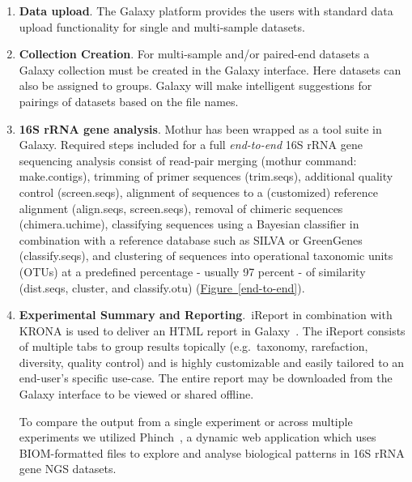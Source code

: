 \begin{enumerate}
\item \textbf{Data upload}.
The Galaxy platform provides the users with standard data upload functionality for single and multi-sample datasets.

\item \textbf{Collection Creation}.
For multi-sample and/or paired-end datasets a Galaxy collection must be created in the Galaxy interface. Here datasets can also be assigned to groups. Galaxy will make intelligent suggestions for pairings of datasets based on the file names.

\item \textbf{16S rRNA gene analysis}. Mothur has been wrapped as a tool suite in Galaxy. Required steps included for a full \textit{end-to-end} 16S rRNA gene sequencing analysis consist of read-pair merging (mothur command: make.contigs), trimming of primer sequences (trim.seqs), additional quality control (screen.seqs), alignment of sequences to a (customized) reference alignment (align.seqs, screen.seqs), removal of chimeric sequences (chimera.uchime), classifying sequences using a Bayesian classifier in combination with a reference database such as SILVA or GreenGenes (classify.seqs), and clustering of sequences into operational taxonomic units (OTUs) at a predefined percentage - usually 97 percent - of similarity (dist.seqs, cluster, and classify.otu) (\hyperref[end-to-end]{Figure~\ref{end-to-end}}).

\item \textbf{Experimental Summary and Reporting}.\ iReport in combination with KRONA is used to deliver an HTML report in Galaxy~\cite{ondov2011interactive}. The iReport consists of multiple tabs to group results topically (e.g.\ taxonomy, rarefaction, diversity, quality control) and is highly customizable and easily tailored to an end-user's specific use-case. The entire report may be downloaded from the Galaxy interface to be viewed or shared offline.


To compare the output from a single experiment or across multiple experiments we utilized Phinch~\cite{bik2014phinch}, a dynamic web application which uses BIOM-formatted files to explore and analyse biological patterns in 16S rRNA gene NGS datasets.

\end{enumerate}


